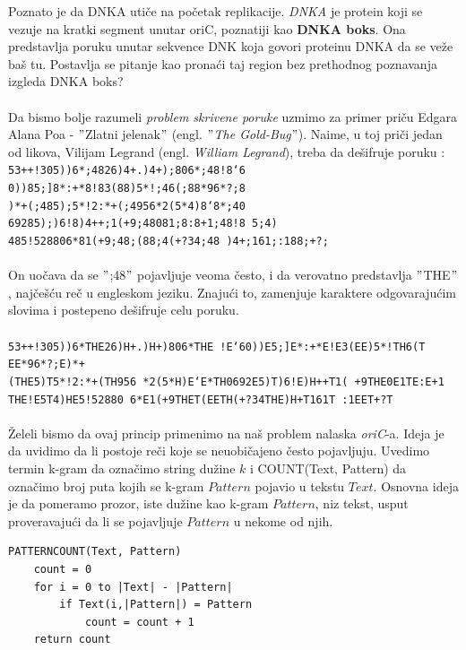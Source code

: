 Poznato je da DNKA utiče na početak replikacije. \textit{DNKA} je protein koji se vezuje na kratki segment unutar oriC, poznatiji kao \textbf{DNKA boks}. Ona predstavlja poruku unutar sekvence DNK koja govori proteinu DNKA da se veže baš tu. Postavlja se pitanje kao pronaći taj region bez prethodnog poznavanja izgleda DNKA boks? \\\\

Da bismo bolje razumeli \textit{problem skrivene poruke} uzmimo za primer priču Edgara Alana Poa - $"$Zlatni jelenak$"$ (engl. \textit{$"$The Gold-Bug$"$}).
Naime, u toj priči jedan od likova, Vilijam Legrand (engl. \textit{William Legrand}), treba da dešifruje poruku :\\

\texttt{53++!305))6*;4826)4+.)4+);806*;48!8`6
0))85;]8*:+*8!83(88)5*!;46(;88*96*?;8\\
)*+(;485);5*!2:*+(;4956*2(5*4)8`8*;40
69285);)6!8)4++;1(+9;48081;8:8+1;48!8
5;4)\\485!528806*81(+9;48;(88;4(+?34;48
)4+;161;:188;+?;}\\\\
On uočava da se $"$;48$"$ pojavljuje veoma često, i da verovatno predstavlja $"$THE$"$, najčešću reč u engleskom jeziku. Znajući to, zamenjuje karaktere odgovarajućim slovima i postepeno dešifruje celu poruku.\\\\
\texttt{53++!305))6*THE26)H+.)H+)806*THE
!E`60))E5;]E*:+*E!E3(EE)5*!TH6(T
EE*96*?;E)*+\\(THE5)T5*!2:*+(TH956
*2(5*H)E`E*TH0692E5)T)6!E)H++T1(
+9THE0E1TE:E+1\\THE!E5T4)HE5!52880
6*E1(+9THET(EETH(+?34THE)H+T161T
:1EET+?T}\\\\
Želeli bismo da ovaj princip primenimo na naš problem nalaska \textit{oriC}-a. Ideja je da uvidimo da li postoje reči koje se neuobičajeno često pojavljuju. Uvedimo termin k-gram da označimo string dužine $k$ i COUNT(Text, Pattern) da označimo broj puta kojih se k-gram $Pattern$ pojavio u tekstu $Text$. Osnovna ideja je da pomeramo prozor, iste dužine kao k-gram $Pattern$, niz tekst, usput proveravajući da li se pojavljuje $Pattern$ u nekome od njih. 

\begin{lstlisting}
PATTERNCOUNT(Text, Pattern)
	count = 0
	for i = 0 to |Text| - |Pattern|
		if Text(i,|Pattern|) = Pattern
			count = count + 1 
	return count
\end{lstlisting}
	
